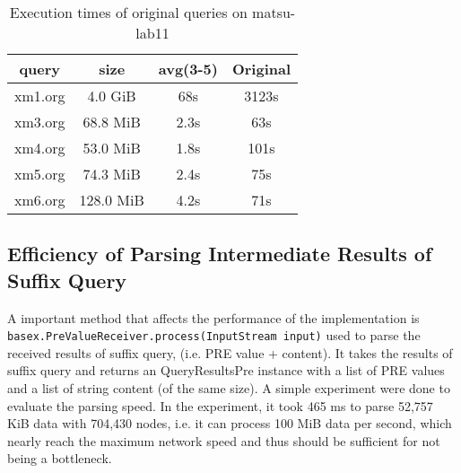 \begin{table}
	\label{tab:orgon11}
	\caption{Execution times of original queries on matsu-lab11}
\centering
\begin{tabular}{c|c|c|c}
	\hline
	query  &   size    & avg(3-5) & Original \\
	\hline 
	xm1.org &   4.0 GiB &  68s     &  3123s   \\
	xm3.org &  68.8 MiB & 2.3s     &    63s   \\
	xm4.org &  53.0 MiB & 1.8s     &   101s   \\
	xm5.org &  74.3 MiB & 2.4s     &    75s   \\
	xm6.org & 128.0 MiB & 4.2s     &    71s   \\ 
	\hline
\end{tabular}

\end{table}




\subsection{Efficiency of Parsing Intermediate Results of Suffix Query}

A important method that affects the performance of the implementation is
\texttt{basex.PreValueReceiver.process(InputStream input)} used
to parse the received results of suffix query, (i.e. PRE value +
content). It takes the results of suffix query and returns an
QueryResultsPre instance with a list of PRE values and a list of
string content (of the same size). A simple experiment were done to evaluate
the parsing speed. In the experiment, it took 465 ms to parse
52,757 KiB data with 704,430 nodes, i.e. it can process 100 MiB
data per second, which nearly reach the maximum network
speed and thus should be sufficient for not being a bottleneck.






